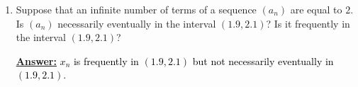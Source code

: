 \documentclass[10pt]{article}
\begin{document}
\begin{enumerate}
\begin{enumerate}
	\item  Suppose that an infinite number of terms of a sequence $(a_n)$ are equal to $2$.  Is $(a_n)$ necessarily eventually in the interval $(1.9,2.1)$?  Is it frequently in the interval $(1.9,2.1)$?

  \textbf{\underline{Answer:}}
  \textcolor{black}{$x_n$ is frequently in $(1.9, 2.1)$ but not necessarily eventually in $(1.9,2.1)$.}
	
	\end{enumerate}
	

\end{enumerate}
\end{document}
